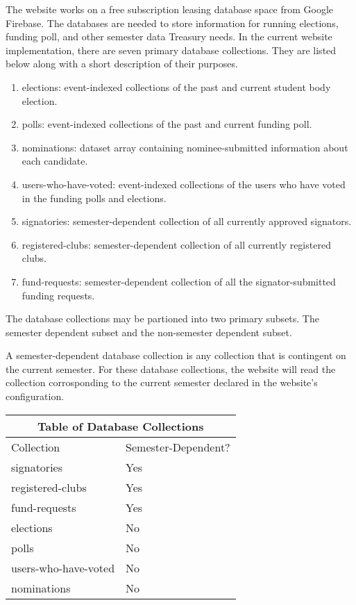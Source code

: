 \documentclass[a4paper]{article}
\begin{document}
The website works on a free subscription leasing database space from Google Firebase. The databases are needed to store information for
running elections, funding poll, and other semester data Treasury needs. In the current website implementation, there are seven primary database collections. They are listed below along with a short description of their purposes.

\begin{enumerate}
  \item elections: event-indexed collections of the past and current student body election.
  \item polls: event-indexed collections of the past and current funding poll.
  \item nominations: dataset array containing nominee-submitted information about each candidate.
  \item users-who-have-voted: event-indexed collections of the users who have voted in the funding polls and elections.
  \item signatories: semester-dependent collection of all currently approved signators.
  \item registered-clubs: semester-dependent collection of all currently registered clubs.
  \item fund-requests: semester-dependent collection of all the signator-submitted funding requests.
\end{enumerate}

The database collections may be partioned into two primary subsets. The semester dependent subset and the non-semester dependent subset.

\begin{definition*}
A semester-dependent database collection is any collection that is contingent on the current semester. For these database collections, the website will read the collection corrosponding to the current semester declared in the website's configuration.
\end{definition*}

\begin{center}
\begin{tabular}{ |p{4cm}||p{4cm}|  }
 \hline
 \multicolumn{2}{|c|}{Table of Database Collections} \\
 \hline
 Collection & Semester-Dependent? \\
 \hline
 signatories & Yes \\
 registered-clubs & Yes \\
 fund-requests & Yes \\
 \hline
 elections & No \\
 polls & No \\
 users-who-have-voted & No \\
 nominations & No \\
 \hline
\end{tabular}
\end{center}
\end{document}

